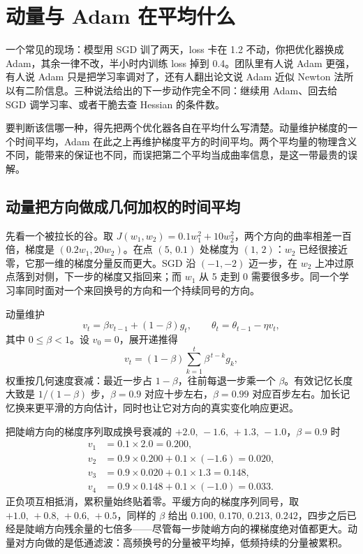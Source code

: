 \section{动量与 Adam 在平均什么}
\label{sec:14-Deep-Learning/03-Optimization-and-Training/02}

一个常见的现场：模型用 SGD 训了两天，loss 卡在 1.2 不动，你把优化器换成 Adam，其余一律不改，半小时内训练 loss 掉到 0.4。团队里有人说 Adam 更强，有人说 Adam 只是把学习率调对了，还有人翻出论文说 Adam 近似 Newton 法所以有二阶信息。三种说法给出的下一步动作完全不同：继续用 Adam、回去给 SGD 调学习率、或者干脆去查 Hessian 的条件数。

要判断该信哪一种，得先把两个优化器各自在平均什么写清楚。动量维护梯度的一个时间平均，Adam 在此之上再维护梯度平方的时间平均。两个平均量的物理含义不同，能带来的保证也不同，而误把第二个平均当成曲率信息，是这一带最贵的误解。

\subsection{动量把方向做成几何加权的时间平均}

先看一个被拉长的谷。取 \(J(w_1,w_2)=0.1w_1^2+10w_2^2\)，两个方向的曲率相差一百倍，梯度是 \((0.2w_1,20w_2)\)。在点 \((5,\,0.1)\) 处梯度为 \((1,\,2)\)：\(w_2\) 已经很接近零，它那一维的梯度分量反而更大。SGD 沿 \((-1,-2)\) 迈一步，在 \(w_2\) 上冲过原点落到对侧，下一步的梯度又指回来；而 \(w_1\) 从 5 走到 0 需要很多步。同一个学习率同时面对一个来回换号的方向和一个持续同号的方向。

动量维护
\[
v_t=\beta v_{t-1}+(1-\beta)g_t,\qquad \theta_t=\theta_{t-1}-\eta v_t,
\]
其中 \(0\le\beta<1\)。设 \(v_0=0\)，展开递推得
\[
v_t=(1-\beta)\sum_{k=1}^{t}\beta^{\,t-k}g_k,
\]
权重按几何速度衰减：最近一步占 \(1-\beta\)，往前每退一步乘一个 \(\beta\)。有效记忆长度大致是 \(1/(1-\beta)\) 步，\(\beta=0.9\) 对应十步左右，\(\beta=0.99\) 对应百步左右。加长记忆换来更平滑的方向估计，同时也让它对方向的真实变化响应更迟。

把陡峭方向的梯度序列取成换号衰减的 \(+2.0,\,-1.6,\,+1.3,\,-1.0\)，\(\beta=0.9\) 时
\[
\begin{aligned}
v_1&=0.1\times2.0=0.200,\\
v_2&=0.9\times0.200+0.1\times(-1.6)=0.020,\\
v_3&=0.9\times0.020+0.1\times1.3=0.148,\\
v_4&=0.9\times0.148+0.1\times(-1.0)=0.033.
\end{aligned}
\]
正负项互相抵消，累积量始终贴着零。平缓方向的梯度序列同号，取 \(+1.0,\,+0.8,\,+0.6,\,+0.5\)，同样的 \(\beta\) 给出 \(0.100,\,0.170,\,0.213,\,0.242\)，四步之后已经是陡峭方向残余量的七倍多——尽管每一步陡峭方向的裸梯度绝对值都更大。动量对方向做的是低通滤波：高频换号的分量被平均掉，低频持续的分量被累积。

